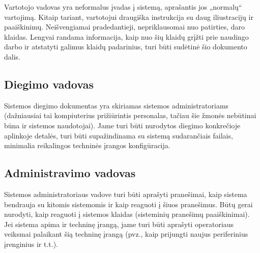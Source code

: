 \documentclass{ktuthesis}
\begin{document}
  Vartotojo vadovas yra neformalus įvadas į sistemą, aprašantis jos „normalų“ vartojimą. Kitaip tariant, vartotojui draugiška instrukcija su daug
  iliustracijų ir paaiškinimų. Neišvengiamai pradedantieji, nepriklausomai nuo patirties, daro klaidas. Lengvai randama informacija, kaip nuo šių
  klaidų grįžti prie naudingo darbo ir atstatyti galimus klaidų padarinius, turi būti sudėtinė šio dokumento dalis.

  \subsection{Diegimo vadovas}

  Sistemos diegimo dokumentas yra skiriamas sistemos administratoriams (dažniausiai tai kompiuterius prižiūrintis personalas, tačiau šie žmonės
  nebūtinai būna ir sistemos naudotojai). Jame turi būti nurodytos diegimo konkrečioje aplinkoje detalės, turi būti supažindinama su sistemą
  sudarančiais failais, minimalia reikalingos techninės įrangos konfigūracija.

  \subsection{Administravimo vadovas}

  Sistemos administratoriaus vadove turi būti aprašyti pranešimai, kaip sistema bendrauja su kitomis sistemomis ir kaip reaguoti į šiuos pranešimus.
  Būtų gerai nurodyti, kaip reaguoti į sistemos klaidas (sisteminių pranešimų paaiškinimai). Jei sistema apima ir techninę įrangą, jame turi būti
  aprašyti operatoriaus veiksmai palaikant šią techninę įrangą (pvz., kaip prijungti naujus periferinius įrenginius ir t.t.).

  \newpage

\end{document}
